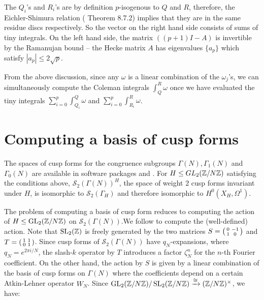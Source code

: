  The $Q_i$'s and $R_i$'s are by definition $p$-isogenous to $Q$ and $R$, therefore, the Eichler-Shimura relation (\cite{Shurman} Theorem 8.7.2) implies that they are in the same residue discs respectively. So the vector on the right hand side consists of sums of tiny integrals. On the left hand side, the matrix $((p+1)I - A)$ is invertible by the Ramanujan bound -- the Hecke matrix $A$ has eigenvalues $\{a_p\}$ which satisfy $|a_p| \leq 2 \sqrt{p}$.

From the above discussion, since any $\omega$ is a linear combination of the $\omega_j$'s, we can simultaneously compute the Coleman integrals $\int_Q^R \omega$ once we have evaluated the tiny integrals $\sum_{i=0}^p \int_{Q_i}^Q \omega$ and $\sum_{i=0}^p \int_{R_i}^R \omega$.

\section{Computing a basis of cusp forms}\label{basis:zyinwa}

The spaces of cusp forms for the congruence subgroups $\Gamma(N), \Gamma_1(N)$ and $\Gamma_0(N)$ are available in software packages \cite{sagemath} and \cite{magma}. For $H \leq GL_2(\mathbb{Z}/N\mathbb{Z})$ satisfying the conditions above, $\mathcal{S}_2(\Gamma(N))^H$, the space of weight $2$ cusp forms invariant under $H$, is isomorphic to $\mathcal{S}_2(\Gamma_H)$ and therefore isomorphic to $H^0(X_H,\Omega^1)$.

The problem of computing a basis of cusp form reduces to computing the action of $H \leq \operatorname{GL}_2(\mathbb{Z}/N\mathbb{Z})$ on $\mathcal{S}_2(\Gamma(N))$.We follow \cite{Zywina2020ComputingAO,Brunault2020} to compute the (well-defined) action. Note that $\operatorname{SL}_2(\mathbb{Z})$ is freely generated by the two matrices $S = \begin{psmallmatrix} 0 & -1 \\ 1 & 0 \end{psmallmatrix}$ and $T = \begin{psmallmatrix} 1 & 1 \\ 0 & 1 \end{psmallmatrix}$. Since cusp forms of $\mathcal{S}_2(\Gamma(N))$ have $q_N$-expansions, where $q_N = e^{2\pi i /N}$, the slash-$k$ operator by $T$ introduces a factor $\zeta_N^n$ for the $n$-th Fourier coefficient. On the other hand, the action by $S$ is given by a linear combination of the basis of cusp forms on $\Gamma(N)$ where the coefficients depend on a certain Atkin-Lehner operator $W_N$. Since $\operatorname{GL}_2(\mathbb{Z}/N\mathbb{Z})/\operatorname{SL}_2(\mathbb{Z}/N\mathbb{Z}) \xrightarrow{\cong} (\mathbb{Z}/N\mathbb{Z})^\times$, we have:

